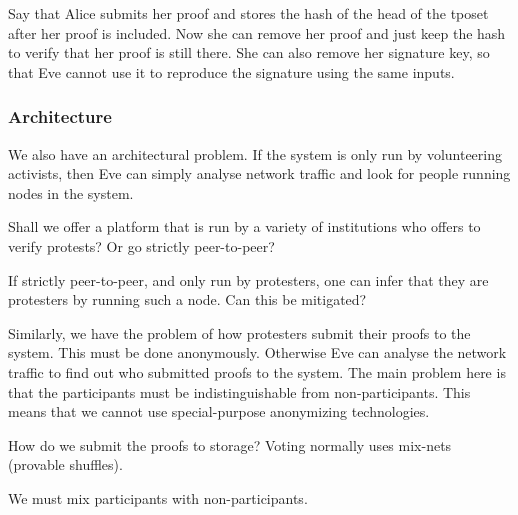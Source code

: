 Say that Alice submits her proof and stores the hash of the head of the 
\ac{tposet} after her proof is included.
Now she can remove her proof and just keep the hash to verify that her proof is 
still there.
She can also remove her signature key, so that Eve cannot use it to reproduce 
the signature using the same inputs.


\subsubsection{Architecture}

We also have an architectural problem.
If the system is only run by volunteering activists, then Eve can simply 
analyse network traffic and look for people running nodes in the system.

\begin{question}
  Shall we offer a platform that is run by a variety of institutions who 
  offers to verify protests?
  Or go strictly peer-to-peer?
\end{question}

\begin{question}
  If strictly peer-to-peer, and only run by protesters, one can infer that 
  they are protesters by running such a node.
  Can this be mitigated?
\end{question}

Similarly, we have the problem of how protesters submit their proofs to the 
system.
This must be done anonymously.
Otherwise Eve can analyse the network traffic to find out who submitted proofs 
to the system.
The main problem here is that the participants must be indistinguishable from 
non-participants.
This means that we cannot use special-purpose anonymizing 
technologies.

\begin{question}
  How do we submit the proofs to storage?
  Voting normally uses mix-nets (provable shuffles).
\end{question}

\begin{remark}
  We must mix participants with non-participants.
\end{remark}

